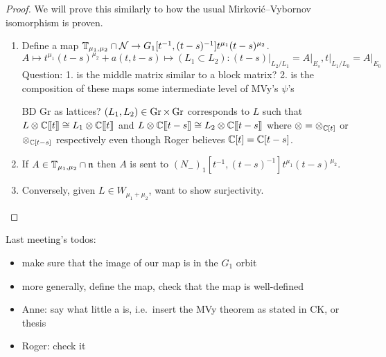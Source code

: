\documentclass{article}
\begin{document}
\begin{proof}
We will prove this similarly to how the usual Mirkovi\'c--Vybornov isomorphism is proven.
\begin{enumerate}[label = Step \arabic*:]
    \item Define a map $\mathbb T_{\mu_1, \mu_2} \cap \mathcal N \rightarrow G_1[t^{-1}, (t-s)^{-1}] t^{\mu_1} (t-s)^{\mu_2}$.
    $$
    A \mapsto t^{\mu_1} (t-s)^{\mu_2} + a(t, t-s) \mapsto (L_1 \subset L_2) : (t-s)\big|_{L_2/L_1} = A\big|_{E_s}  , t\big|_{L_1/L_0} = A\big|_{E_0}
    $$
    Question: 1. is the middle matrix similar to a block matrix? 2. is the composition of these maps some intermediate level of MVy's $\psi$'s 

    BD Gr as lattices? $(L_1,L_2)\in\operatorname{Gr}\times\operatorname{Gr}$ corresponds to $L$ such that $L\otimes\mathbb C[\hspace{-.12em}[ {t} ]\hspace{-.12em}]\cong L_1\otimes\mathbb C[\hspace{-.12em}[ {t} ]\hspace{-.12em}]$ and $L\otimes\mathbb C[\hspace{-.12em}[ {t-s} ]\hspace{-.12em}]\cong L_2\otimes\mathbb C[\hspace{-.12em}[ {t-s} ]\hspace{-.12em}]$ where $\otimes = \otimes_{\mathbb C[t]}$ or $\otimes_{\mathbb C[t-s]}$ respectively even though Roger believes $\mathbb C[t] = \mathbb C[t-s]$.  

    \item If $A \in \mathbb T_{\mu_1,\mu_2} \cap \mathfrak n$ then $A$ is sent to $(N_-)_1[t^{-1}, (t-s)^{-1}] t^{\mu_1} (t-s)^{\mu_2}$. 

    \item Conversely, given $L \in W_{\mu_1 + \mu_2}$, want to show surjectivity.
\end{enumerate}
\end{proof}

Last meeting's todos:
\begin{itemize}
    \item make sure that the image of our map is in the $G_1$ orbit
    \item more generally, define the map, check that the map is well-defined
    \item Anne: say what little a is, i.e.\ insert the MVy theorem as stated in CK, or thesis
    \item Roger: check it
\end{itemize}





\end{document}

